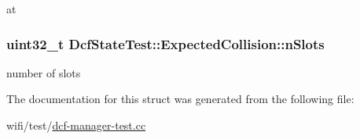 at 

\subsubsection[{\texorpdfstring{n\+Slots}{nSlots}}]{\setlength{\rightskip}{0pt plus 5cm}uint32\+\_\+t Dcf\+State\+Test\+::\+Expected\+Collision\+::n\+Slots}\hypertarget{structDcfStateTest_1_1ExpectedCollision_a508f27d63c14ecf00454af70a785afe9}{}\label{structDcfStateTest_1_1ExpectedCollision_a508f27d63c14ecf00454af70a785afe9}


number of slots 



The documentation for this struct was generated from the following file\+:\begin{DoxyCompactItemize}
\item 
wifi/test/\hyperlink{dcf-manager-test_8cc}{dcf-\/manager-\/test.\+cc}\end{DoxyCompactItemize}
